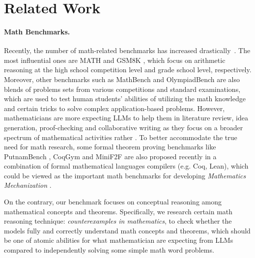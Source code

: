 \section{Related Work}
\paragraph{Math Benchmarks.} Recently, the number of math-related benchmarks has increased drastically~\cite{amini2019mathqa, yang2019learning, zhengminif2f, hendrycksmath2021, cobbe2021gsm8k, GHOSTS, liu2024mathbench, he2024olympiadbench, lu2024mathvista}. The most influential ones are MATH \cite{hendrycksmath2021} and GSM8K \cite{cobbe2021gsm8k}, which focus on arithmetic reasoning at the high school competition level and grade school level, respectively. Moreover, other benchmarks such as MathBench \cite{liu2024mathbench} and OlympiadBench \cite{he2024olympiadbench} are also blends of problems sets from various competitions and standard examinations, which are used to test human students' abilities of utilizing the math knowledge and certain tricks to solve complex application-based problems. However, mathematicians are more expecting LLMs to help them in literature review, idea generation, proof-checking and collaborative writing as they focus on a broader spectrum of mathematical activities rather \cite{frieder2024largelanguagemodelsmathematicians}. To better accommodate the true need for math research, some formal theorem proving benchmarks like PutnamBench \cite{tsoukalasputnambench}, CoqGym \cite{yang2019learning} and MiniF2F \cite{zhengminif2f} are also proposed recently in a combination of formal mathematical languages compilers (e.g. Coq, Lean), which could be viewed as the important math benchmarks for developing \textit{Mathematics Mechanization} \cite{wen2001mathematics, mathmechanization}.

On the contrary, our benchmark \dataname{} focuses on conceptual reasoning among mathematical concepts and theorems. Specifically, we research certain math reasoning technique: \textit{counterexamples in mathematics}, to check whether the models fully and correctly understand math concepts and theorems, which should be one of atomic abilities for what mathematician are expecting from LLMs compared to independently solving some simple math word problems.

